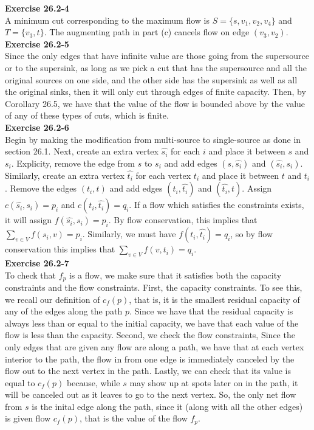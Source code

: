 \documentclass{article}
\begin{document}
\noindent\textbf{Exercise 26.2-4}\\

A minimum cut corresponding to the maximum flow is $S = \{s, v_1, v_2, v_4\}$ and $T= \{v_3, t\}$.  The augmenting path in part (c) cancels flow on edge $(v_3, v_2)$.\\

\noindent\textbf{Exercise 26.2-5}\\

Since the only edges that have infinite value are those going from the supersource or to the supersink, as long as we pick a cut that has the supersource and all the original sources on one side, and the other side has the supersink as well as all the original sinks, then it will only cut through edges of finite capacity. Then, by Corollary 26.5, we have that the value of the flow is bounded above by the value of any of these types of cuts, which is finite.\\

\noindent\textbf{Exercise 26.2-6}\\

Begin by making the modification from multi-source to single-source as done in section 26.1.  Next, create an extra vertex $\hat{s_i}$ for each $i$ and place it between $s$ and $s_i$.  Explicity, remove the edge from $s$ to $s_i$ and add edges $(s, \hat{s_i})$ and $(\hat{s_i}, s_i)$.  Similarly, create an extra vertex $\hat{t_i}$ for each vertex $t_i$ and place it between $t$ and $t_i$.  Remove the edges $(t_i, t)$ and add edges $(t_i, \hat{t_i})$ and $(\hat{t_i}, t)$.  Assign $c(\hat{s_i},s_i) = p_i$ and $c(t_i, \hat{t_i}) = q_i$.  If a flow which satisfies the constraints exists, it will assign $f(\hat{s_i}, s_i) = p_i$.  By flow conservation, this implies that $\sum_{v \in V} f(s_i, v) = p_i$.  Similarly, we must have $f(t_i, \hat{t_i}) = q_i$, so by flow conservation this implies that $\sum_{v \in V} f(v,t_i) = q_i$.\\

\noindent\textbf{Exercise 26.2-7}\\

To check that $f_p$ is a flow, we make sure that it satisfies both the capacity constraints and the flow constraints. First, the capacity constraints. To see this, we recall our definition of $c_f(p)$, that is, it is the smallest residual capacity of any of the edges along the path $p$. Since we have that the residual capacity is always less than or equal to the initial capacity, we have that each value of the flow is less than the capacity. Second, we check the flow constraints, Since the only edges that are given any flow are along a path, we have that at each vertex interior to the path, the flow in from one edge is immediately canceled by the flow out to the next vertex in the path. Lastly, we can check that its value is equal to $c_f(p)$ because, while $s$ may show up at spots later on in the path, it will be canceled out as it leaves to go to the next vertex. So, the only net flow from $s$ is the inital edge along the path, since it (along with all the other edges) is given flow  $c_f(p)$, that is the value of the flow $f_p$.\\
\end{document}
